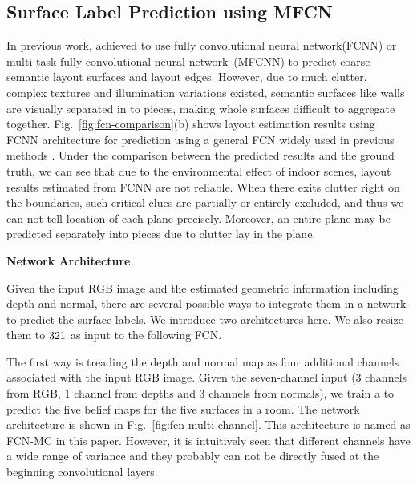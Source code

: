 \subsection{Surface Label Prediction using MFCN}
\label{sec:surfacelabel}
%
In previous work, \cite{dasgupta2016delay,ren2016coarse} achieved to use fully convolutional neural network(FCNN) or multi-task fully convolutional neural network~(MFCNN) to predict coarse semantic layout surfaces and layout edges. 
%
However, due to much clutter, complex textures and illumination variations existed, semantic surfaces like walls are visually separated in to pieces, making whole surfaces difficult to aggregate together. 
%
Fig.~\ref{fig:fcn-comparison}(b) shows layout estimation results using FCNN architecture for prediction using a general FCN widely used in previous methods \cite{dasgupta2016delay,ren2016coarse}. 
Under the comparison between the predicted results and the ground truth, we can see that due to the environmental effect of indoor scenes, layout results estimated from FCNN are not reliable. 
When there exits clutter right on the boundaries, such critical clues are partially or entirely excluded, and thus we can not tell location of each plane precisely. 
Moreover, an entire plane may be predicted separately into pieces due to clutter lay in the plane.

\textbf{Network Architecture}

Given the input RGB image and the estimated geometric information including depth and normal, there are several possible ways to integrate them in a network to predict the surface labels. We introduce two architectures here.
We also resize them to $321 \time 321$ as input to the following FCN. 

The first way is treading the depth and normal map as four additional channels associated with the input RGB image. Given the seven-channel input (3 channels from RGB, 1 channel from depths and 3 channels from normals), we train a  to predict the five belief maps for the five surfaces in a room. The network architecture is shown in Fig.~\ref{fig:fcn-multi-channel}. This architecture is named as FCN-MC in this paper. 
%
However, it is intuitively seen that different channels have a wide range of variance and they probably can not be directly fused at the beginning convolutional layers. 

